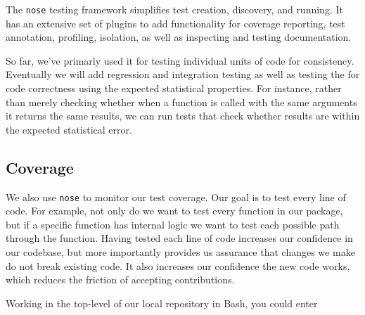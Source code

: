 The \texttt{nose} testing framework simplifies test creation, discovery,
and running. It has an extensive set of plugins to add functionality
for coverage reporting, test annotation, profiling, isolation, as well
as inspecting and testing documentation.

So far, we've primarly used it for testing individual units of code for
consistency.  Eventually we will add regression and integration testing as well
as testing the for code correctness using the expected statistical properties.
For instance, rather than merely checking whether when a function is called
with the same arguments it returns the same results, we can run tests that
check whether results are within the expected statistical error.


%
%

\subsection{Coverage}

We also use \texttt{nose} to monitor our test coverage.  Our goal is to
test every line of code.  For example, not only do we want to test every
function in our package, but if a specific function has internal logic
we want to test each possible path through the function.  Having tested
each line of code increases our confidence in our codebase, but more
importantly provides us assurance that changes we make do not break
existing code.  It also increases our confidence the new code works,
which reduces the friction of accepting contributions.

Working in the top-level of our local repository in Bash, you could
enter


